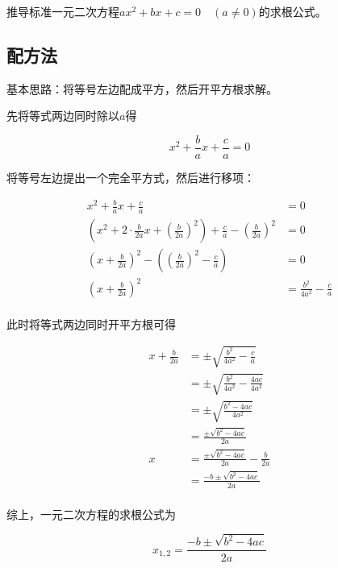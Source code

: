 

推导标准一元二次方程$ax^2 + bx + c = 0\quad(a \ne0)$的求根公式。


\subsection{配方法}

基本思路：将等号左边配成平方，然后开平方根求解。

先将等式两边同时除以$a$得

\[ x^2 + \frac bax + \frac ca = 0 \]

将等号左边提出一个完全平方式，然后进行移项：

\begin{align*}
  x^2 + \frac bax + \frac ca &= 0 \\
  \left(x^2 + 2\cdot\frac b{2a}x + \left(\frac b{2a}\right)^2\right) + \frac ca - \left(\frac b{2a}\right)^2 &= 0 \\
  \left(x + \frac b{2a}\right)^2 - \left(\left(\frac b{2a}\right)^2 - \frac ca\right) &= 0 \\
  \left(x + \frac b{2a}\right)^2 &= \frac{b^2}{4a^2} - \frac ca \\
\end{align*}

此时将等式两边同时开平方根可得

\begin{align*}
  x + \frac b{2a} &= \pm\sqrt{\frac{b^2}{4a^2} - \frac ca} \\
  &= \pm\sqrt{\frac{b^2}{4a^2} - \frac{4ac}{4a^2}} \\
  &= \pm\sqrt{\frac{b^2 - 4ac}{4a^2}} \\
  &= \frac{\pm\sqrt{b^2 - 4ac}}{2a} \\
  x &= \frac{\pm\sqrt{b^2 - 4ac}}{2a} - \frac b{2a} \\
  &= \frac{-b \pm\sqrt{b^2 - 4ac}}{2a} \\
\end{align*}

综上，一元二次方程的求根公式为

\[ x_{1,2} = \frac{-b \pm\sqrt{b^2 - 4ac}}{2a} \]
